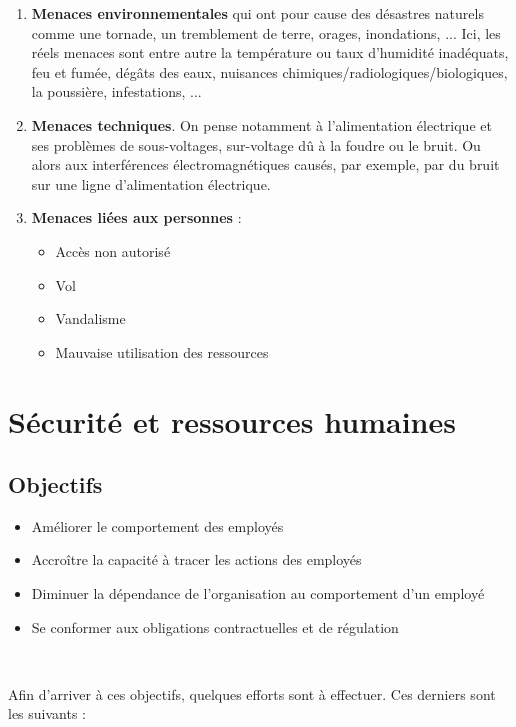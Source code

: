 \documentclass{report}
\begin{document}
\begin{enumerate}
    \item \textbf{Menaces environnementales} qui ont pour cause des désastres naturels comme une tornade, un tremblement de terre, orages, inondations, ... Ici, les réels menaces sont entre autre la température ou taux d'humidité inadéquats, feu et fumée, dégâts des eaux, nuisances chimiques/radiologiques/biologiques, la poussière, infestations, ...

    \item \textbf{Menaces techniques}. On pense notamment à l'alimentation électrique et ses problèmes de sous-voltages, sur-voltage dû à la foudre ou le bruit. Ou alors aux interférences électromagnétiques causés, par exemple, par du bruit sur une ligne d'alimentation électrique.

    \item \textbf{Menaces liées aux personnes} :
    \begin{itemize}
        \item Accès non autorisé
        \item Vol
        \item Vandalisme
        \item Mauvaise utilisation des ressources
    \end{itemize}
\end{enumerate}

\section{Sécurité et ressources humaines}

\subsection{Objectifs}

\begin{itemize}
    \item Améliorer le comportement des employés
    \item Accroître la capacité à tracer les actions des employés
    \item Diminuer la dépendance de l'organisation au comportement d'un employé
    \item Se conformer aux obligations contractuelles et de régulation
\end{itemize}~

Afin d'arriver à ces objectifs, quelques efforts sont à effectuer. Ces derniers sont les suivants :
\end{document}
